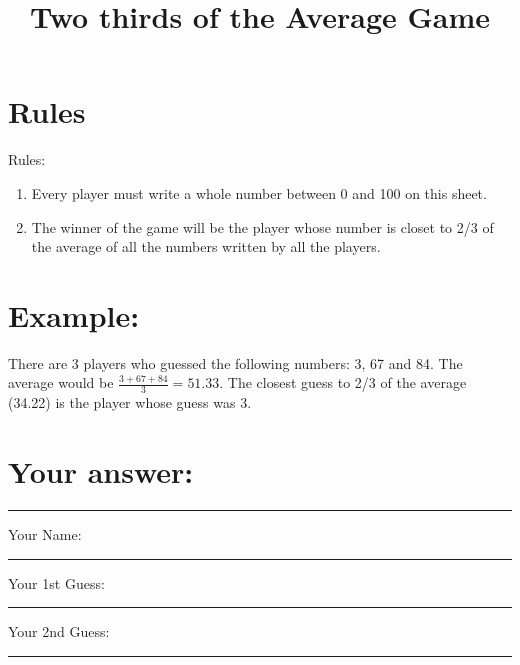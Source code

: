 \documentclass{article}
\title{Two thirds of the Average Game}
\date{}
\begin{document}
\maketitle

\section{Rules}

Rules:

\begin{enumerate}
\def\labelenumi{\arabic{enumi}.}
\itemsep1pt\parskip0pt
\item
  Every player must write a whole number between 0 and 100 on this
  sheet.
\item
  The winner of the game will be the player whose number is closet to
  2/3 of the average of all the numbers written by all the players.
\end{enumerate}


\section{Example:}

There are 3 players who guessed the following numbers: 3, 67 and 84. The
average would be $\frac{3+67+84}{3}=51.33$. The closest guess to 2/3 of
the average (34.22) is the player whose guess was 3.

\section{Your answer:}

\begin{center}\rule{3in}{0.4pt}\end{center}

Your Name:

\begin{center}\rule{3in}{0.4pt}\end{center}

Your 1st Guess:

\begin{center}\rule{3in}{0.4pt}\end{center}

Your 2nd Guess:

\begin{center}\rule{3in}{0.4pt}\end{center}
\end{document}
